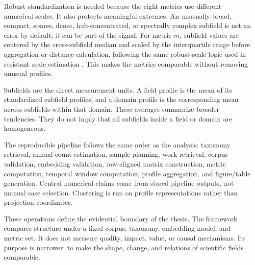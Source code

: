 Robust standardization is needed because the eight metrics use different numerical scales. It also protects meaningful extremes. An unusually broad, compact, sparse, dense, hub-concentrated, or spectrally complex subfield is not an error by default; it can be part of the signal. For metric \(m\), subfield values are centered by the cross-subfield median and scaled by the interquartile range before aggregation or distance calculation, following the same robust-scale logic used in resistant scale estimation \parencite{rousseeuw1993alternatives}. This makes the metrics comparable without removing unusual profiles.

Subfields are the direct measurement units. A field profile is the mean of its standardized subfield profiles, and a domain profile is the corresponding mean across subfields within that domain. These averages summarize broader tendencies. They do not imply that all subfields inside a field or domain are homogeneous.

The reproducible pipeline follows the same order as the analysis: taxonomy retrieval, annual count estimation, sample planning, work retrieval, corpus validation, embedding validation, row-aligned matrix construction, metric computation, temporal window computation, profile aggregation, and figure/table generation. Central numerical claims come from stored pipeline outputs, not manual case selection. Clustering is run on profile representations rather than projection coordinates.

These operations define the evidential boundary of the thesis. The framework compares structure under a fixed corpus, taxonomy, embedding model, and metric set. It does not measure quality, impact, value, or causal mechanisms. Its purpose is narrower: to make the shape, change, and relations of scientific fields comparable.
